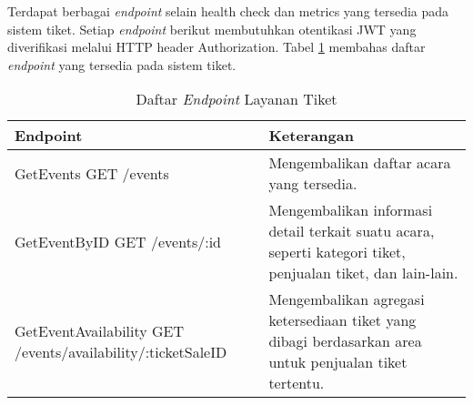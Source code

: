 Terdapat berbagai \textit{endpoint} selain health check dan metrics yang tersedia pada sistem tiket. Setiap \textit{endpoint} berikut membutuhkan otentikasi JWT yang diverifikasi melalui HTTP header Authorization. Tabel \ref{table:ticket-endpoint} membahas daftar \textit{endpoint} yang tersedia pada sistem tiket.

\begin{table}[H]
    \centering
    \caption{Daftar \textit{Endpoint} Layanan Tiket}
    \label{table:ticket-endpoint}
    \begin{tabular}{|p{}|p{}|}
        \hline
        \textbf{Endpoint}                                                    & \textbf{Keterangan}                                                                                                                                                                                                                                                                                                                                                                            \\
        \hline
        GetEvents \newline GET /events                                       & Mengembalikan daftar acara yang tersedia.                                                                                                                                                                                                                                                                                                                                                      \\
        \hline
        GetEventByID \newline GET /events/:id                                & Mengembalikan informasi detail terkait suatu acara, seperti kategori tiket, penjualan tiket, dan lain-lain.                                                                                                                                                                                                                                                                                    \\
        \hline
        GetEventAvailability \newline GET /events/availability/:ticketSaleID & Mengembalikan agregasi ketersediaan tiket yang dibagi berdasarkan area untuk penjualan tiket tertentu.                                                                                                                                                                                                                                                                                         \\

\end{tabular}
\end{table}
